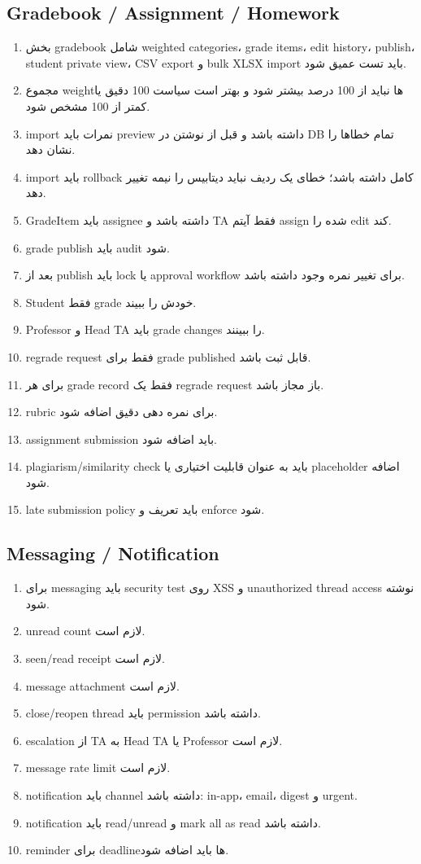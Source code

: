 \documentclass[11pt,a4paper]{article}
\begin{document}
\subsection{Gradebook / Assignment / Homework}
\begin{enumerate}[label=\arabic*. ,resume]
\item بخش gradebook شامل weighted categories، grade items، edit history، publish، student private view، CSV export و bulk XLSX import باید تست عمیق شود.
\item مجموع weightها نباید از 100 درصد بیشتر شود و بهتر است سیاست 100 دقیق یا کمتر از 100 مشخص شود.
\item import نمرات باید preview داشته باشد و قبل از نوشتن در DB تمام خطاها را نشان دهد.
\item import باید rollback کامل داشته باشد؛ خطای یک ردیف نباید دیتابیس را نیمه تغییر دهد.
\item GradeItem باید assignee داشته باشد و TA فقط آیتم assign شده را edit کند.
\item grade publish باید audit شود.
\item بعد از publish باید lock یا approval workflow برای تغییر نمره وجود داشته باشد.
\item Student فقط grade خودش را ببیند.
\item Professor و Head TA باید grade changes را ببینند.
\item regrade request فقط برای grade published قابل ثبت باشد.
\item برای هر grade record فقط یک regrade request باز مجاز باشد.
\item rubric برای نمره دهی دقیق اضافه شود.
\item assignment submission باید اضافه شود.
\item plagiarism/similarity check باید به عنوان قابلیت اختیاری یا placeholder اضافه شود.
\item late submission policy باید تعریف و enforce شود.
\end{enumerate}
\subsection{Messaging / Notification}
\begin{enumerate}[label=\arabic*. ,resume]
\item برای messaging باید security test روی XSS و unauthorized thread access نوشته شود.
\item unread count لازم است.
\item seen/read receipt لازم است.
\item message attachment لازم است.
\item close/reopen thread باید permission داشته باشد.
\item escalation از TA به Head TA یا Professor لازم است.
\item message rate limit لازم است.
\item notification باید channel داشته باشد: in-app، email، digest و urgent.
\item notification باید read/unread و mark all as read داشته باشد.
\item reminder برای deadlineها باید اضافه شود.
\end{enumerate}
\end{document}
